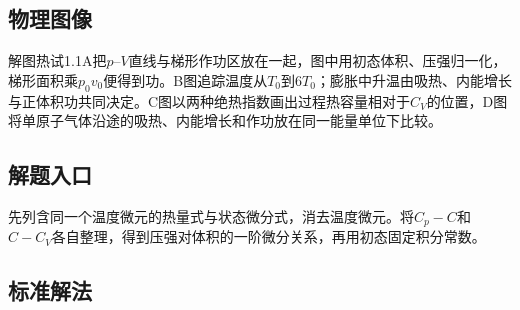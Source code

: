 \documentclass[UTF8,fontset=fandol,a4paper,11pt]{ctexart}
\begin{document}


\subsection*{物理图像}

解图热试1.1A把$p$--$V$直线与梯形作功区放在一起，图中用初态体积、压强归一化，梯形面积乘$p_0v_0$便得到功。B图追踪温度从$T_0$到$6T_0$；膨胀中升温由吸热、内能增长与正体积功共同决定。C图以两种绝热指数画出过程热容量相对于$C_V$的位置，D图将单原子气体沿途的吸热、内能增长和作功放在同一能量单位下比较。



\subsection*{解题入口}

先列含同一个温度微元的热量式与状态微分式，消去温度微元。将$C_p-C$和$C-C_V$各自整理，得到压强对体积的一阶微分关系，再用初态固定积分常数。



\subsection*{标准解法}
\end{document}
